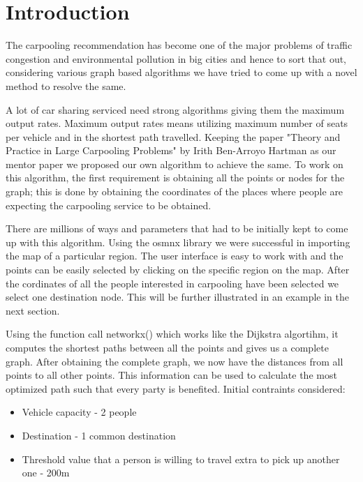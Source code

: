 \documentclass[main.tex]{subfiles}
\begin{document}
\section{Introduction}
The carpooling recommendation has become one of the major problems of traffic
congestion and environmental pollution in big cities and hence to sort that out,
considering various graph based algorithms we have tried to come up with a novel
method to resolve the same.

A lot of car sharing serviced need strong algorithms giving them the maximum
output rates. Maximum output rates means utilizing maximum number of seats per
vehicle and in the shortest path travelled. Keeping the paper "Theory and
Practice in Large Carpooling Problems" by Irith Ben-Arroyo Hartman as our mentor
paper we proposed our own algorithm to achieve the same.  To work on this
algorithm, the first requirement is obtaining all the points or nodes for the
graph; this is done by obtaining the coordinates of the places where people are
expecting the carpooling service to be obtained.

There are millions of ways and parameters that had to be initially kept to come
up with this algorithm. Using the osmnx library we were successful in importing
the map of a particular region. The user interface is easy to work with and the
points can be easily selected by clicking on the specific region on the map.
After the cordinates of all the people interested in carpooling have been
selected we select one destination node. This will be further illustrated in an
example in the next section.

Using the function call networkx() which works like the Dijkstra algortihm, it
computes the shortest paths between all the points and gives us a complete
graph.  After obtaining the complete graph, we now have the distances from all
points to all other points. This information can be used to calculate the most
optimized path such that every party is benefited.
Initial contraints considered:
\begin{itemize}
  \item Vehicle capacity - 2 people
  \item Destination      - 1 common destination
  \item Threshold value that a person is willing to travel extra to pick up
    another one - 200m
\end{itemize}
\end{document}
